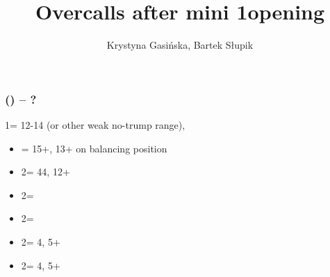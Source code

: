 \documentclass[12pt, a4paper]{article}
\title{Overcalls after mini 1\nt opening}
\author{Krystyna Gasińska, Bartek Słupik}
\begin{document}
\maketitle


\subsubsection*{(\alrts{1\nt}) -- ?}
1\nt = 12-14 (or other weak no-trump range), \bal
\begin{itemize}
    \item \dbl = 15+, 13+ on balancing position
    \item 2\clubs = 44\major, 12+
    \item 2\diams = \trsf{\hearts}
    \item 2\hearts = \trsf{\spades}
    \item 2\spades = 4\spades, 5+\minor
    \item 2\nt = 4\hearts, 5+\minor
\end{itemize}

\end{document}
